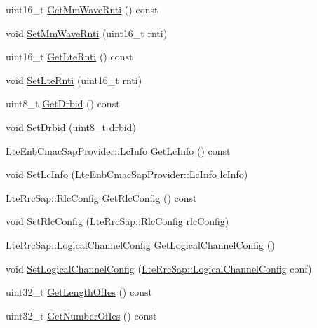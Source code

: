 \begin{DoxyCompactItemize}
uint16\+\_\+t \hyperlink{classns3_1_1EpcX2RlcSetupRequestHeader_acf6c7dca99e86a72d9cce2e62d96c13d}{Get\+Mm\+Wave\+Rnti} () const 
\item 
void \hyperlink{classns3_1_1EpcX2RlcSetupRequestHeader_a3d9cc6fa3ce8d16de9ee82733ea8879d}{Set\+Mm\+Wave\+Rnti} (uint16\+\_\+t rnti)
\item 
uint16\+\_\+t \hyperlink{classns3_1_1EpcX2RlcSetupRequestHeader_a5a816f7262a2967b73aff2175e30925c}{Get\+Lte\+Rnti} () const 
\item 
void \hyperlink{classns3_1_1EpcX2RlcSetupRequestHeader_aad8b9979e87f9e4beada7c4f49f35e0e}{Set\+Lte\+Rnti} (uint16\+\_\+t rnti)
\item 
uint8\+\_\+t \hyperlink{classns3_1_1EpcX2RlcSetupRequestHeader_acf92e018ceae9695f6d3343a88dc3402}{Get\+Drbid} () const 
\item 
void \hyperlink{classns3_1_1EpcX2RlcSetupRequestHeader_ae1f239fea5c84b38b86cef19d6e2ace9}{Set\+Drbid} (uint8\+\_\+t drbid)
\item 
\hyperlink{structns3_1_1LteEnbCmacSapProvider_1_1LcInfo}{Lte\+Enb\+Cmac\+Sap\+Provider\+::\+Lc\+Info} \hyperlink{classns3_1_1EpcX2RlcSetupRequestHeader_aea896f2f84ba977d714a2b2673235f60}{Get\+Lc\+Info} () const 
\item 
void \hyperlink{classns3_1_1EpcX2RlcSetupRequestHeader_a443bfec654de4fd575964908f02ad79d}{Set\+Lc\+Info} (\hyperlink{structns3_1_1LteEnbCmacSapProvider_1_1LcInfo}{Lte\+Enb\+Cmac\+Sap\+Provider\+::\+Lc\+Info} lc\+Info)
\item 
\hyperlink{structns3_1_1LteRrcSap_1_1RlcConfig}{Lte\+Rrc\+Sap\+::\+Rlc\+Config} \hyperlink{classns3_1_1EpcX2RlcSetupRequestHeader_a4ba5866272a962a8a0f07076aec62bd3}{Get\+Rlc\+Config} () const 
\item 
void \hyperlink{classns3_1_1EpcX2RlcSetupRequestHeader_a10f4ba573083dd1538417b1c2d0dae03}{Set\+Rlc\+Config} (\hyperlink{structns3_1_1LteRrcSap_1_1RlcConfig}{Lte\+Rrc\+Sap\+::\+Rlc\+Config} rlc\+Config)
\item 
\hyperlink{structns3_1_1LteRrcSap_1_1LogicalChannelConfig}{Lte\+Rrc\+Sap\+::\+Logical\+Channel\+Config} \hyperlink{classns3_1_1EpcX2RlcSetupRequestHeader_afd9b366830a3496203eefe53e03ccb61}{Get\+Logical\+Channel\+Config} ()
\item 
void \hyperlink{classns3_1_1EpcX2RlcSetupRequestHeader_a67d57f6551162f4ab0678c93ddec65d4}{Set\+Logical\+Channel\+Config} (\hyperlink{structns3_1_1LteRrcSap_1_1LogicalChannelConfig}{Lte\+Rrc\+Sap\+::\+Logical\+Channel\+Config} conf)
\item 
uint32\+\_\+t \hyperlink{classns3_1_1EpcX2RlcSetupRequestHeader_a1939317bc8aac9058a0f66c4a5ca22d6}{Get\+Length\+Of\+Ies} () const 
\item 
uint32\+\_\+t \hyperlink{classns3_1_1EpcX2RlcSetupRequestHeader_acbce2887da40fc92e7e5c12b3994a500}{Get\+Number\+Of\+Ies} () const 
\end{DoxyCompactItemize}
